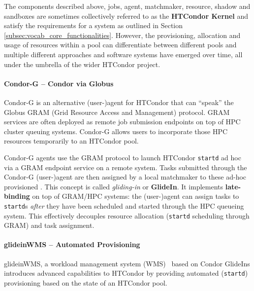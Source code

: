\documentclass{sig-alternate}
\begin{document}
The components described above, jobs, agent, matchmaker, resource, shadow and
sandboxes are sometimes collectively referred to as the \textbf{HTCondor
Kernel} and satisfy the requirements for a \pilotjob system as outlined in
Section \ref{subsec:vocab_core_functionalities}.
However, the provisioning, allocation and usage of resources within a pool can
differentiate between different pools and multiple different approaches and
software systems have emerged over time, all under the umbrella of the wider
HTCondor project.

%
\paragraph{Condor-G -- Condor via Globus}

Condor-G is an alternative (user-)agent for HTCondor that can ``speak'' the
Globus GRAM (Grid Resource Access and Management) protocol. GRAM services are
often deployed as remote job submission endpoints on top of HPC cluster
queuing systems. Condor-G allows users to incorporate those HPC resources
temporarily to an HTCondor pool.

Condor-G agents use the GRAM protocol to launch HTCondor \texttt{startd}
\pilots ad hoc via a GRAM endpoint service on a remote system. Tasks submitted
through the Condor-G (user-)agent are then assigned by a local matchmaker to
these ad-hoc provisioned \pilots. This concept is called \textit {gliding-in}
or \textbf{GlideIn}. It implements \textbf{late-binding} on top of GRAM/HPC
systems: the (user-)agent can assign tasks to \texttt{startd}s \textit{after}
they have been scheduled and started through the HPC queueing system. This
effectively decouples resource allocation (\texttt{startd} scheduling through
GRAM) and task assignment.

%
\paragraph{glideinWMS -- Automated \pilot Provisioning}

glideinWMS, a workload management system (WMS)~\cite{1742-6596-119-6-062044}
based on Condor GlideIns introduces advanced \pilotjob capabilities to HTCondor
by providing automated \pilot (\texttt{startd}) provisioning based on the state
of an HTCondor pool.


%
\end{document}
